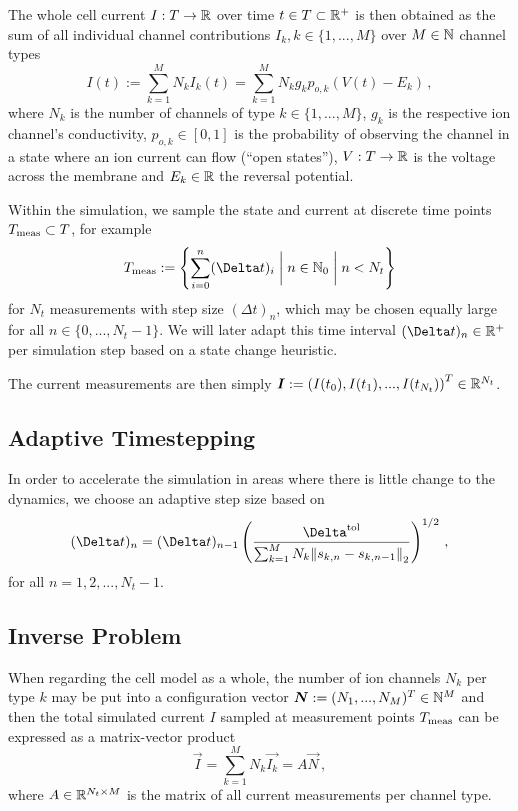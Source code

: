 \documentclass[USenglish,twocolumn]{article}
\begin{document}
  The whole cell current $I: T \rightarrow \mathbb{R}$ over time $t \in T \subset \mathbb{R}^+$ is then obtained as the sum of all individual channel contributions $I_k, k \in \{1, ..., M\}$ over $M \in \mathbb{N}$ channel types
  \begin{equation}
    I(t) := \sum_{k=1}^{M} N_k I_k(t) = \sum_{k=1}^{M} N_k g_k p_{o,k} \left(V(t)-E_k\right)\,,
  \end{equation}
  where $N_k$ is the number of channels of type $k \in \{1, ..., M\}$, $g_k$ is the respective ion channel's conductivity, $p_{o, k} \in [0, 1]$ is the probability of observing the channel in a state where an ion current can flow (``open states''), $V: T \rightarrow \mathbb{R}$ is the voltage across the membrane and $E_k \in \mathbb{R}$ the reversal potential.

  Within the simulation, we sample the state and current at discrete time points $T_{\rm meas} \subset T$, for example
  $$T_{\rm meas} := \left\{\sum_{i=0}^n (\Delta t)_i \;\bigg|\; n \in \N_0 \;\bigg|\; n < N_t\right\}$$
  for $N_t$ measurements with step size $(\Delta t)_n$, which may be chosen equally large for all $n \in \{0, ..., N_t - 1\}$.
  We will later adapt this time interval $(\Delta t)_n \in \R^+$ per simulation step based on a state change heuristic.

  The current measurements are then simply ${\bm{I}} := \left(I(t_0), I(t_1), ..., I(t_{N_t})\right)^T \in \mathbb{R}^{N_t}$.

  \subsection{Adaptive Timestepping}
  In order to accelerate the simulation in areas where there is little change to the dynamics, we choose an adaptive step size based on
  \begin{equation}
    (\Delta t)_n = (\Delta t)_{n-1} \left(\frac{\Delta^{\rm tol}}{\sum_{k=1}^{M} N_k \norm{s_{k,n} - s_{k,n-1}}_2}\right)^{1/2}\,,
  \end{equation}
  for all $n = 1, 2, ..., N_t - 1$.

  \subsection{Inverse Problem}
  When regarding the cell model as a whole, the number of ion channels $N_k$ per type $k$ may be put into a configuration vector ${\bm{N}} := (N_1, ..., N_M)^T \in \mathbb{N}^M$ and then the total simulated current $I$ sampled at measurement points $T_{\rm meas}$ can be expressed as a matrix-vector product
  \begin{equation}
    \vec{I} = \sum_{k=1}^{M} N_k \vec{I_k} = A \vec{N}\,,
    \label{eq:matrix-formulation}
  \end{equation}
  where $A \in \mathbb{R}^{N_t \times M}$ is the matrix of all current measurements per channel type.
\end{document}
